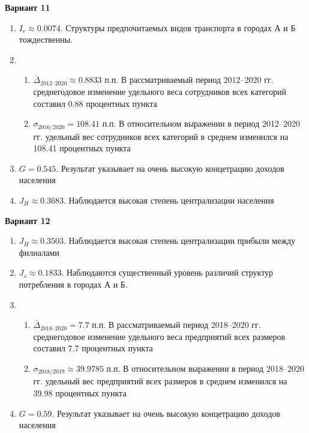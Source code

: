\documentclass{article}
\begin{document}
\textbf{Вариант 11}
\begin{enumerate}
\item $I_r\approx 0.0074$. Структуры предпочитаемых видов транспорта в городах А и Б тождественны.
\item \begin{enumerate} \item $\bar\Delta_\text{2012--2020}\approx 0.8833$ п.п. В рассматриваемый период 2012--2020 гг. среднегодовое изменение удельного веса сотрудников всех категорий составил 0.88 процентных пункта
\item $\sigma_\text{2016/2020}= 108.41$ п.п. В относительном выражении в период 2012--2020 гг. удельный вес сотрудников всех категорий в среднем изменился на 108.41 процентных пункта\end{enumerate}
\item $G= 0.545$. Результат указывает на очень высокую концетрацию доходов населения
\item $J_H \approx 0.3683$. Наблюдается высокая степень централизации населения
\end{enumerate}

\textbf{Вариант 12}
\begin{enumerate}
\item $J_H \approx 0.3503$. Наблюдается высокая степень централизации прибыли между филиалами
\item $J_s\approx 0.1833$. Наблюдаются существенный уровень различий структур потребления в городах А и Б.
\item \begin{enumerate} \item $\bar\Delta_\text{2018--2020}= 7.7$ п.п. В рассматриваемый период 2018--2020 гг. среднегодовое изменение удельного веса предприятий всех размеров составил 7.7 процентных пункта
\item $\sigma_\text{2018/2019}\approx 39.9785$ п.п. В относительном выражении в период 2018--2020 гг. удельный вес предприятий всех размеров в среднем изменился на 39.98 процентных пункта\end{enumerate}
\item $G= 0.59$. Результат указывает на очень высокую концетрацию доходов населения
\end{enumerate}
\end{document}
